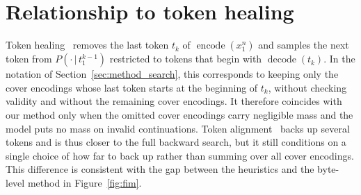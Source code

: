 \documentclass{article} %
\newcommand{\encf}{\operatorname{encode}}
\newcommand{\decf}{\operatorname{decode}}
\begin{document}
\section{Relationship to token healing}
\label{app:healing}
Token healing~\citep{dagan2024tokenizer} removes the last token $t_k$ of $\encf(x_1^n)$ and samples the next token from $P(\cdot\,|\,t_1^{k-1})$ restricted to tokens that begin with $\decf(t_k)$. In the notation of Section~\ref{sec:method_search}, this corresponds to keeping only the cover encodings whose last token starts at the beginning of $t_k$, without checking validity and without the remaining cover encodings. It therefore coincides with our method only when the omitted cover encodings carry negligible mass and the model puts no mass on invalid continuations. Token alignment~\citep{athiwaratkun2024alignment} backs up several tokens and is thus closer to the full backward search, but it still conditions on a single choice of how far to back up rather than summing over all cover encodings. This difference is consistent with the gap between the heuristics and the byte-level method in Figure~\ref{fig:fim}.
\end{document}

